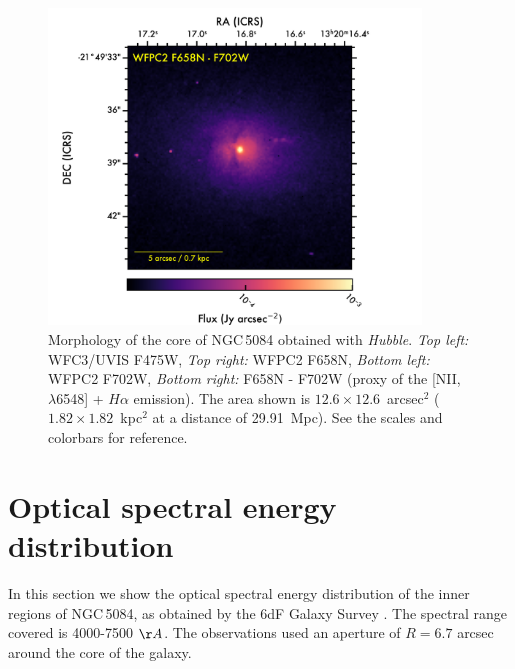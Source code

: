 \documentclass[modern]{CORE-AAS/aastex631}
\begin{document}
\begin{figure}[]
\begin{center}
\includegraphics[trim={140 0 60 57}, clip, height=8.4cm]{FIGURES/NGC5084_F658N_F702W.png}

\caption{Morphology of the core of NGC\,5084 obtained with \emph{Hubble}. \emph{Top left:} WFC3/UVIS F475W, \emph{Top right:} WFPC2 F658N, \emph{Bottom left:} WFPC2 F702W, \emph{Bottom right:} F658N - F702W (proxy of the [NII, $\lambda$6548] + $H\alpha$ emission). The area shown is $12.6\times12.6$~arcsec$^2$ ($1.82\times1.82$~kpc$^2$ at a distance of 29.91~Mpc). See the scales and colorbars for reference.} 
\label{fig:NGC5084_multiband}
\end{center}
\end{figure}

\section{Optical spectral energy distribution} 
\label{Appendix:OpticalSpectra}

In this section we show the optical spectral energy distribution of the inner regions of NGC\,5084, as obtained by the 6dF Galaxy Survey \citep{jones+2004mnras355_747}. The spectral range covered is 4000-7500 $\AA$. The observations used an aperture of $R=6.7$ arcsec around the core of the galaxy. 

% 





\end{document}
